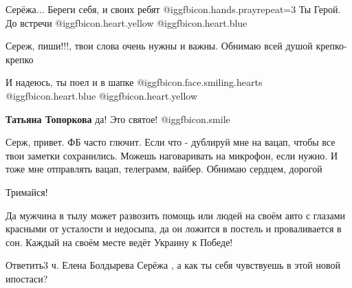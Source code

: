  
 
 
 
 
\zzSecCmt

\begin{itemize} %

Серёжа...
Береги себя, и своих ребят  @igg{fbicon.hands.pray}{repeat=3} 
Ты Герой.
До встречи  @igg{fbicon.heart.yellow}  @igg{fbicon.heart.blue} 


Сереж, пиши!!!, твои слова очень нужны и важны. Обнимаю всей душой крепко-крепко


И надеюсь, ты поел и в шапке @igg{fbicon.face.smiling.hearts}
@igg{fbicon.heart.blue}  @igg{fbicon.heart.yellow} 

\textbf{Татьяна Топоркова} да! Это святое!  @igg{fbicon.smile} 


Серж, привет. ФБ часто глючит. Если что - дублируй мне на вацап, чтобы все твои
заметки сохранились. Можешь наговаривать на микрофон, если нужно. И тоже мне
отправлять вацап, телеграмм, вайбер. Обнимаю сердцем, дорогой


Тримайся!


Да мужчина в тылу может развозить помощь или людей на своём авто с глазами
красными от усталости и недосыпа, да он ложится в постель и проваливается в
сон. Каждый на своём месте ведёт Украину к Победе!

Ответить3 ч.
Елена Болдырева
Серёжа , а как ты себя чувствуешь в этой новой ипостаси?

\end{itemize} %
